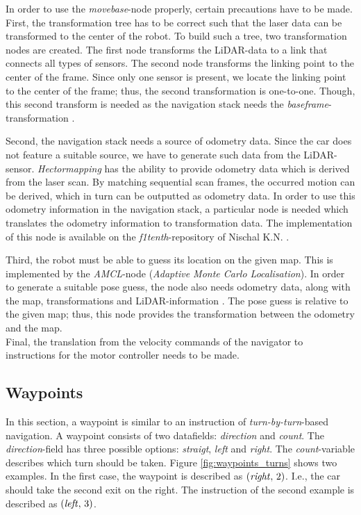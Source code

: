 \documentclass[conference,a4paper]{IEEEtran}
\begin{document}
In order to use the \emph{move\textunderscore base}-node properly, certain precautions have to be made. First, the transformation tree has to be correct such that the laser data can be transformed to the center of the robot. To build such a tree, two transformation nodes are created. The first node transforms the LiDAR-data to a link that connects all types of sensors. The second node transforms the linking point to the center of the frame. Since only one sensor is present, we locate the linking point to the center of the frame; thus, the second transformation is one-to-one. Though, this second transform is needed as the navigation stack needs the \emph{base\textunderscore frame}-transformation \cite{Kohlbrecher2012_tf} \cite{Woodall2015}.

Second, the navigation stack needs a source of odometry data. Since the car does not feature a suitable source, we have to generate such data from the LiDAR-sensor. \emph{Hector\textunderscore mapping} has the ability to provide odometry data which is derived from the laser scan. By matching sequential scan frames, the occurred motion can be derived, which in turn can be outputted as odometry data. In order to use this odometry information in the navigation stack, a particular node is needed which translates the odometry information to transformation data. The implementation of this node is available on the \emph{f1tenth}-repository of Nischal K.N. \cite{K.N.2016}.

Third, the robot must be able to guess its location on the given map. This is implemented by the \emph{AMCL}-node (\emph{Adaptive Monte Carlo Localisation}). In order to generate a suitable pose guess, the node also needs odometry data, along with the map, transformations and LiDAR-information \cite{Gerkey2016} \cite{Thrun1999}. The pose guess is relative to the given map; thus, this node provides the transformation between the odometry and the map.\\
Final, the translation from the velocity commands of the navigator to instructions for the motor controller needs to be made.

\subsection{Waypoints}
In this section, a waypoint is similar to an instruction of  \emph{turn-by-turn}-based navigation. A waypoint consists of two datafields: \emph{direction} and \emph{count}.
The \emph{direction}-field has three possible options: \emph{straigt}, \emph{left} and \emph{right}. The \emph{count}-variable describes which turn should be taken. Figure \ref{fig:waypoints_turns} shows two examples. In the first case, the waypoint is described as $(\text{\emph{right}},\,2)$. I.e., the car should take the second exit on the right. The instruction of the second example is described as $(\text{\emph{left}},\,3)$. 
\end{document}
